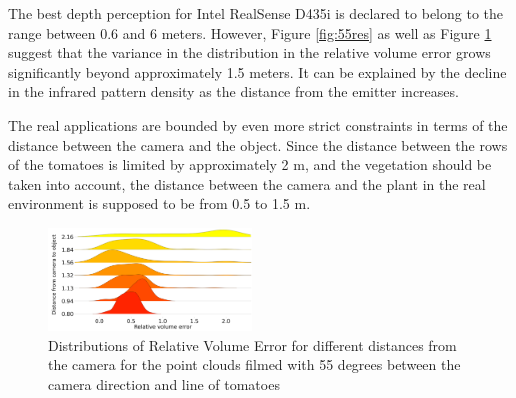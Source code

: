The best depth perception for Intel RealSense D435i is declared to belong to the range between 0.6 and 6 meters.
However, Figure \ref{fig:55res} as well as Figure \ref{fig:90res} suggest that the variance in the distribution in the relative volume error grows significantly beyond approximately 1.5 meters.
It can be explained by the decline in the infrared pattern density as the distance from the emitter increases.



The real applications are bounded by even more strict constraints in terms of the distance between the camera and the object.
Since the distance between the rows of the tomatoes is limited by approximately 2 \si{m}, and the vegetation should be taken into account, the distance between the camera and the plant in the real environment is supposed to be from 0.5 to 1.5 \si{m}.

\begin{figure}[!htb]
  \centering
      \includegraphics[width=0.48\textwidth]{images/res90.png}
      \caption{Distributions of Relative Volume Error for different distances from the camera for the point clouds filmed with 55 degrees between the camera direction and line of tomatoes}
      \label{fig:90res}
\end{figure}


